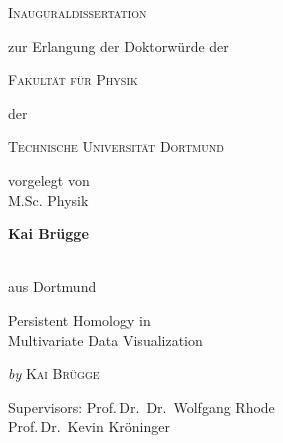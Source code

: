 
\begin{titlepage}
	\begin{center}
		\textsc{\huge Inauguraldissertation}
                \vskip 1cm
                \begin{large}
                  zur Erlangung der Doktorwürde der\\[0.50cm]
                  \begin{Large}
                    \textsc{Fakultät für Physik}\\[0.50cm]
                  \end{Large}
                  der\\[0.50cm]
                  \begin{Large}
                    \textsc{Technische Universität Dortmund}\par
                  \end{Large}
                \end{large}
		\vfill
		\begin{large}
                  vorgelegt von\\
                  M.Sc. Physik\\[0.5cm]
                  \begin{LARGE}
                    \textbf{Kai Brügge}
                  \end{LARGE}\\[0.5cm]
                  aus Dortmund
		\end{large}
    \vskip 1cm
	\end{center}
\end{titlepage}


\begin{titlepage}
  \phantom{}
  \vfill 
  \begin{center}
    \begin{singlespace*}
      \begin{Huge}
          Persistent Homology in\\
          Multivariate Data Visualization\par
      \end{Huge}
      \vskip 0.25cm
      \emph{by}
      \vskip 0.25cm
      \textsc{Kai Brügge}\par
    \end{singlespace*}
  \end{center}
  \vfill
  \begin{singlespace*}
    Supervisors:            Prof.\,Dr.\, Dr.\, Wolfgang Rhode\\
    \phantom{Supervisors:}  Prof.\,Dr.\, Kevin Kröninger
  \end{singlespace*}
\end{titlepage}

\newpage
\null
\thispagestyle{empty}
\newpage
